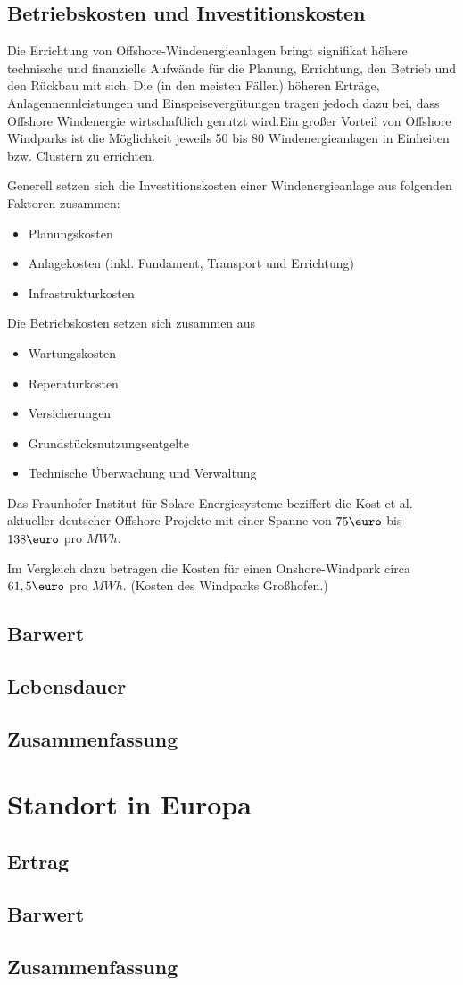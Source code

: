 \documentclass[a4paper,12pt]{article}
\begin{document}
	\subsection{Betriebskosten und Investitionskosten}
	Die Errichtung von Offshore-Windenergieanlagen bringt signifikat höhere technische und finanzielle Aufwände für die Planung, Errichtung, den Betrieb und den Rückbau mit sich. Die (in den meisten Fällen) höheren Erträge, Anlagennennleistungen und Einspeisevergütungen tragen jedoch dazu bei, dass Offshore Windenergie wirtschaftlich genutzt wird.\newline Ein großer Vorteil von Offshore Windparks ist die Möglichkeit jeweils 50 bis 80 Windenergieanlagen in Einheiten bzw. Clustern zu errichten.\\ \par
	\noindent Generell setzen sich die Investitionskosten einer Windenergieanlage aus folgenden Faktoren zusammen:
	\begin{itemize}
		\item Planungskosten
		\item Anlagekosten (inkl. Fundament, Transport und Errichtung)
		\item Infrastrukturkosten
	\end{itemize}
	Die Betriebskosten setzen sich zusammen aus
	\begin{itemize}
		\item Wartungskosten
		\item Reperaturkosten
		\item Versicherungen
		\item Grundstücksnutzungsentgelte
		\item Technische Überwachung und Verwaltung
	\end{itemize}
	Das Fraunhofer-Institut für Solare Energiesysteme beziffert die Kost et al. aktueller deutscher Offshore-Projekte mit einer Spanne von $75\mbox{\euro}$ bis $138\mbox{\euro}$ pro $MWh$.\\ \par
	\noindent Im Vergleich dazu betragen die Kosten für einen Onshore-Windpark circa $61,5\mbox{\euro}$ pro $MWh$. (Kosten des Windparks Großhofen.)
	\subsection{Barwert}
	\subsection{Lebensdauer}
	\subsection{Zusammenfassung}
	\newpage
	\section{Standort in Europa}
	\subsection{Ertrag}
	\subsection{Barwert}
	\subsection{Zusammenfassung}
	\newpage
	\listoffigures
	
\end{document}
